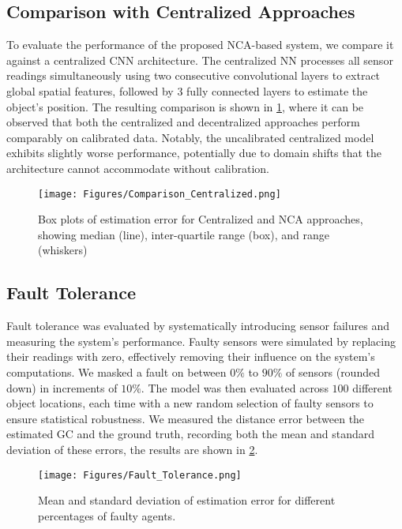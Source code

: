 \subsection{Comparison with Centralized Approaches}



To evaluate the performance of the proposed \ac{NCA}-based system, we compare it against a centralized \ac{CNN} architecture. The centralized \ac{NN} processes all sensor readings simultaneously using two consecutive convolutional layers to extract global spatial features, followed by 3 fully connected layers to estimate the object's position. The resulting comparison is shown in \cref{fig:center}, where it can be observed that both the centralized and decentralized approaches perform comparably on calibrated data. Notably, the uncalibrated centralized model exhibits slightly worse performance, potentially due to domain shifts that the architecture cannot accommodate without calibration.

\begin{figure}[t]
\centerline{\texttt{[image: Figures/Comparison\_Centralized.png]}}
\caption{Box plots of estimation error for Centralized and NCA approaches, showing median (line), inter-quartile range (box), and range (whiskers)}
\label{fig:center}
\end{figure}


\subsection{Fault Tolerance}

Fault tolerance was evaluated by systematically introducing sensor failures and measuring the system's performance.  Faulty sensors were simulated by replacing their readings with zero, effectively removing their influence on the system's computations. We masked a fault on between $0\%$ to $90\%$ of sensors (rounded down) in increments of $10\%$. 
    The model was then evaluated across $100$ different object locations, each time with a new random selection of faulty sensors to ensure statistical robustness. We measured the distance error between the estimated \ac{GC} and the ground truth, recording both the mean and standard deviation of these errors, the results are shown in \cref{fig:faulty}.

\begin{figure}[t]
\centerline{\texttt{[image: Figures/Fault\_Tolerance.png]}}
\caption{Mean and standard deviation of estimation error for different percentages of faulty agents.}
\label{fig:faulty}
\end{figure}



